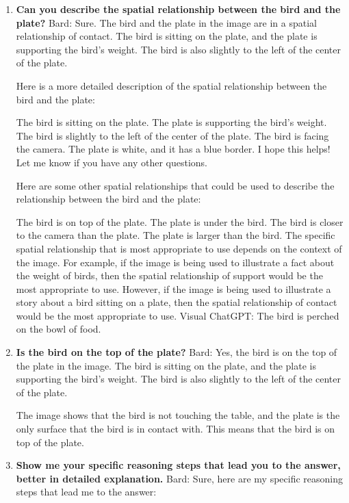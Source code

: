     \begin{enumerate}
        \item \textbf{Can you describe the spatial relationship between the bird and the plate?}
        \subitem Bard:
        Sure. The bird and the plate in the image are in a spatial relationship of contact. The bird is sitting on the plate, and the plate is supporting the bird's weight. The bird is also slightly to the left of the center of the plate.
        
        Here is a more detailed description of the spatial relationship between the bird and the plate:
        
        The bird is sitting on the plate.
        The plate is supporting the bird's weight.
        The bird is slightly to the left of the center of the plate.
        The bird is facing the camera.
        The plate is white, and it has a blue border.
        I hope this helps! Let me know if you have any other questions.
        
        Here are some other spatial relationships that could be used to describe the relationship between the bird and the plate:
        
        The bird is on top of the plate.
        The plate is under the bird.
        The bird is closer to the camera than the plate.
        The plate is larger than the bird.
        The specific spatial relationship that is most appropriate to use depends on the context of the image. For example, if the image is being used to illustrate a fact about the weight of birds, then the spatial relationship of support would be the most appropriate to use. However, if the image is being used to illustrate a story about a bird sitting on a plate, then the spatial relationship of contact would be the most appropriate to use.
        \subitem Visual ChatGPT: The bird is perched on the bowl of food.
        \item \textbf{Is the bird on the top of the plate?}
        \subitem Bard: 
        Yes, the bird is on the top of the plate in the image. The bird is sitting on the plate, and the plate is supporting the bird's weight. The bird is also slightly to the left of the center of the plate.
        
        The image shows that the bird is not touching the table, and the plate is the only surface that the bird is in contact with. This means that the bird is on top of the plate.
        \item \textbf{Show me your specific reasoning steps that lead you to the answer, better in detailed explanation.}
        \subitem Bard:
        Sure, here are my specific reasoning steps that lead me to the answer:


\end{enumerate}
